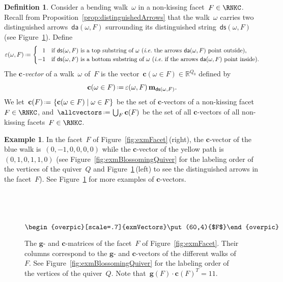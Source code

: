 \documentclass{amsart}
\theoremstyle{definition}
\newtheorem{definition}[theorem]{Definition}
\newtheorem{example}[theorem]{Example}
\newcommand{\R}{\mathbb{R}} %
\renewcommand{\b}[1]{\mathbf{#1}} %
\newcommand{\set}[2]{\left\{ #1 \;\middle|\; #2 \right\}} %
\newcommand{\one}{{1\!\!1}} %
\newcommand{\eqdef}{\mbox{\,\raisebox{0.2ex}{\scriptsize\ensuremath{\mathrm:}}\ensuremath{=}\,}} %
\newcommand{\fref}[1]{Figure~\ref{#1}} %
\newcommand{\ie}{\textit{i.e.}~} %
\newcommand{\darkblue}{\color{darkblue}} %
\newcommand{\defn}[1]{\textsl{\darkblue #1}} %
\newcommand{\distinguishedArrows}[2]{\mathsf{da}(#1,#2)} %
\newcommand{\distinguishedString}[2]{\mathsf{ds}(#1,#2)} %
\newcommand{\distinguishedSign}[2]{\varepsilon(#1,#2)} %
\newcommand{\gvectors}[1]{\mathbf{g}(#1)} %
\newcommand{\cvector}[2]{\mathbf{c}(#1 \in #2)} %
\newcommand{\cvectors}[1]{\mathbf{c}(#1)} %
\newcommand{\multiplicityVector}{\b{m}} %
\begin{document}
\begin{definition}\label{def: c-vectors}
Consider a bending walk~$\omega$ in a non-kissing facet~$F \in \RNKC$.
Recall from Proposition~\ref{prop:distinguishedArrows} that the walk~$\omega$ carries two distinguished arrows~$\distinguishedArrows{\omega}{F}$ surrounding its distinguished string~$\distinguishedString{\omega}{F}$ (see \fref{fig:gcvectors}).
Define
\[
\distinguishedSign{\omega}{F} \eqdef 
\begin{cases}
\phantom{-}1 & \text{if~$\distinguishedString{\omega}{F}$ is a top substring of~$\omega$ (\ie the arrows~$\distinguishedArrows{\omega}{F}$ point outside),} \\
-1 & \text{if~$\distinguishedString{\omega}{F}$ is a bottom substring of~$\omega$ (\ie if the arrows~$\distinguishedArrows{\omega}{F}$ point inside).}
\end{cases}
\]
The \defn{$\b{c}$-vector} of a walk~$\omega$ of~$F$ is the vector~${\cvector{\omega}{F} \in \R^{Q_0}}$ defined by
\[
\cvector{\omega}{F} \eqdef \distinguishedSign{\omega}{F} \, \multiplicityVector_{\distinguishedString{\omega}{F}}.
\]
We let~$\cvectors{F} \eqdef \set{\cvector{\omega}{F}}{\omega \in F}$ be the set of $\b{c}$-vectors of a non-kissing facet~$F \in \RNKC$, and~$\allcvectors \eqdef \bigcup_F \cvectors{F}$ be the set of all $\b{c}$-vectors of all non-kissing facets~${F \in \RNKC}$.
\end{definition}

\begin{example}
In the facet~$F$ of \fref{fig:exmFacet}\,(right), the $\b{c}$-vector of the blue walk is~$(0,-1,0,0,0,0)$ while the $\b{c}$-vector of the yellow path is~$(0,1,0,1,1,0)$ (see \fref{fig:exmBlossomingQuiver} for the labeling order of the vertices of the quiver~$Q$ and \fref{fig:gcvectors}\,(left) to see the distinguished arrows in the facet~$F$).
See \fref{fig:gcvectors} for more examples of $\b{c}$-vectors.

\begin{figure}[t]
	\capstart
	\centerline{$\raisebox{-1.5cm}{\begin{overpic}[scale=.7]{exmVectors}\put(60,4){$F$}\end{overpic}}$ \qquad }
	\caption{The $\b{g}$- and $\b{c}$-matrices of the facet~$F$ of \fref{fig:exmFacet}. Their columns correspond to the $\b{g}$- and $\b{c}$-vectors of the different walks of~$F$. See \fref{fig:exmBlossomingQuiver} for the labeling order of the vertices of the quiver~$Q$. Note that~$\gvectors{F} \cdot \cvectors{F}^T = \one$.}
	\label{fig:gcvectors}
\end{figure}
\end{example}
\end{document}
